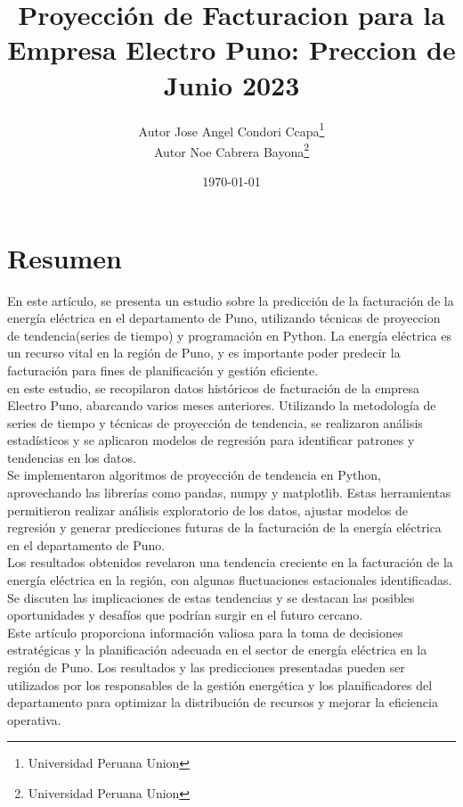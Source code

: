 \documentclass{article}
\begin{document}
\title{Proyección de Facturacion para la Empresa Electro Puno: Preccion de Junio 2023}
\author{Autor Jose Angel Condori Ccapa\thanks{Universidad Peruana Union}\\Autor Noe Cabrera Bayona\thanks{Universidad Peruana Union}}
\date{\today}
\maketitle

\section{Resumen}

En este artículo, se presenta un estudio sobre la predicción de la facturación de la energía eléctrica en el departamento de Puno, utilizando técnicas de proyeccion de tendencia(series de tiempo) y programación en Python. La energía eléctrica es un recurso vital en la región de Puno, y es importante poder predecir la facturación para fines de planificación y gestión eficiente.
\\

en este estudio, se recopilaron datos históricos de facturación de la empresa Electro Puno, abarcando varios meses anteriores. Utilizando la metodología de series de tiempo y técnicas de proyección de tendencia, se realizaron análisis estadísticos y se aplicaron modelos de regresión para identificar patrones y tendencias en los datos.
\\

Se implementaron algoritmos de proyección de tendencia en Python, aprovechando las librerías como pandas, numpy y matplotlib. Estas herramientas permitieron realizar análisis exploratorio de los datos, ajustar modelos de regresión y generar predicciones futuras de la facturación de la energía eléctrica en el departamento de Puno.
\\

Los resultados obtenidos revelaron una tendencia creciente en la facturación de la energía eléctrica en la región, con algunas fluctuaciones estacionales identificadas. Se discuten las implicaciones de estas tendencias y se destacan las posibles oportunidades y desafíos que podrían surgir en el futuro cercano.
\\

Este artículo proporciona información valiosa para la toma de decisiones estratégicas y la planificación adecuada en el sector de energía eléctrica en la región de Puno. Los resultados y las predicciones presentadas pueden ser utilizados por los responsables de la gestión energética y los planificadores del departamento para optimizar la distribución de recursos y mejorar la eficiencia operativa.
\end{document}
